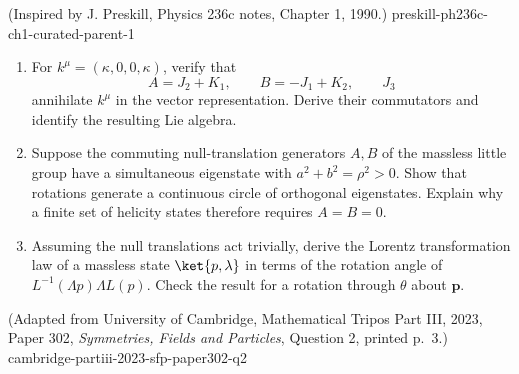 \begin{enumerate}
  {(Inspired by J. Preskill, Physics 236c notes, Chapter 1, 1990.)}
  {preskill-ph236c-ch1-curated-parent-1}
\begin{enumerate}
\item
For \(k^\mu=(\kappa,0,0,\kappa)\), verify that
\[
 A=J_2+K_1,\qquad B=-J_1+K_2,\qquad J_3
\]
annihilate \(k^\mu\) in the vector representation.  Derive their
commutators and identify the resulting Lie algebra.
\item
Suppose the commuting null-translation generators \(A,B\) of the massless
little group have a simultaneous eigenstate with
\(a^2+b^2=\rho^2>0\).  Show that rotations generate a continuous circle of
orthogonal eigenstates.  Explain why a finite set of helicity states
therefore requires \(A=B=0\).
\item
Assuming the null translations act trivially, derive the Lorentz
transformation law of a massless state \(\ket{p,\lambda}\) in terms of the
rotation angle of \(L^{-1}(\Lambda p)\Lambda L(p)\).  Check the result for
a rotation through \(\theta\) about \(\mathbf p\).
\end{enumerate}

  {(Adapted from University of Cambridge, Mathematical Tripos Part III, 2023, Paper 302, \emph{Symmetries, Fields and Particles}, Question 2, printed p.~3.)}
  {cambridge-partiii-2023-sfp-paper302-q2}


\end{enumerate}
